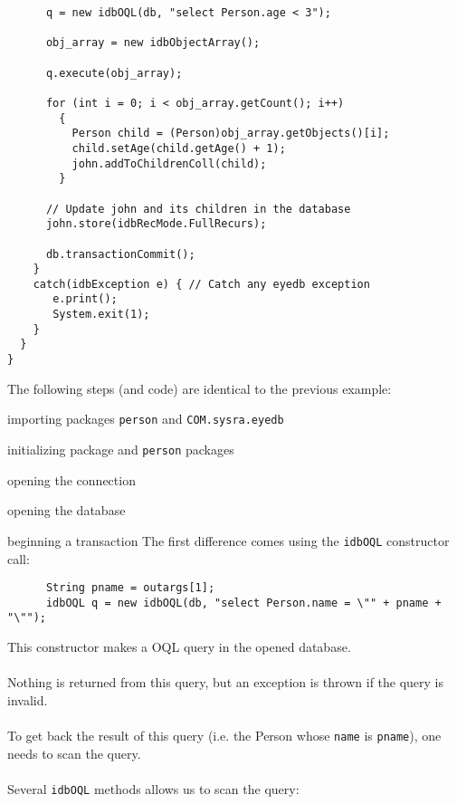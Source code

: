 {\begin{verbatim}
      q = new idbOQL(db, "select Person.age < 3");

      obj_array = new idbObjectArray();

      q.execute(obj_array);

      for (int i = 0; i < obj_array.getCount(); i++)
        {
          Person child = (Person)obj_array.getObjects()[i];
          child.setAge(child.getAge() + 1);
          john.addToChildrenColl(child);
        }

      // Update john and its children in the database
      john.store(idbRecMode.FullRecurs);

      db.transactionCommit();
    }
    catch(idbException e) { // Catch any eyedb exception
       e.print();
       System.exit(1);
    }
  }
}
\end{verbatim}
}
The following steps (and code) are identical to the previous example:
\bi
\item importing packages \texttt{person} and \texttt{COM.sysra.eyedb}
\item initializing \eyedb package and \texttt{person} packages
\item opening the connection
\item opening the database
\item beginning a transaction
\ei
The first difference comes using the \texttt{idbOQL} constructor call:
{\verbsize \begin{verbatim}
      String pname = outargs[1];
      idbOQL q = new idbOQL(db, "select Person.name = \"" + pname + "\"");
\end{verbatim}
}
This constructor makes a \eyedb OQL query in the opened database.
\\
\\
Nothing is returned from this query, but an exception is thrown if the query
is invalid.
\\
\\
To get back the result of this query (i.e. the Person whose \texttt{name}
is \texttt{pname}), one needs to scan the query.
\\
\\
Several \texttt{idbOQL} methods allows us to scan the query:
